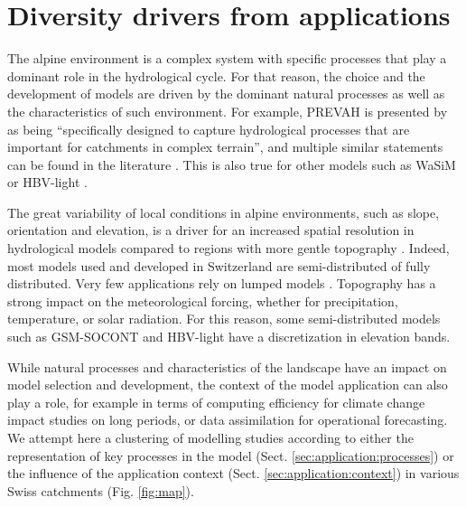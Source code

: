 \documentclass[10pt,a4paper]{article}
\begin{document}
\section{Diversity drivers from applications}
\label{sec:application}

The alpine environment is a complex system with specific processes that play a dominant role in the hydrological cycle. For that reason, the choice and the development of models are driven by the dominant natural processes as well as the characteristics of such environment. For example, PREVAH is presented by \citet{Anghileri2019} as being “specifically designed to capture hydrological processes that are important for catchments in complex terrain”, and multiple similar statements can be found in the literature \citep{Verbunt2007, Zappa2007a, Koplin2010,  Brunner2019e}. This is also true for other models such as WaSiM \citep{Jasper2002, Jasper2003, Thornton2021} or HBV-light \citep{SikorskaSenoner2020}. 

The great variability of local conditions in alpine environments, such as slope, orientation and elevation, is a driver for an increased spatial resolution in hydrological models compared to regions with more gentle topography \citep{Gurtz2003}. Indeed, most models used and developed in Switzerland are semi-distributed of fully distributed. Very few applications rely on lumped models \citep[for example,][]{Keller2019a}. Topography has a strong impact on the meteorological forcing, whether for precipitation, temperature, or solar radiation. For this reason, some semi-distributed models such as GSM-SOCONT and HBV-light have a discretization in elevation bands.

While natural processes and characteristics of the landscape have an impact on model selection and development, the context of the model application can also play a role, for example in terms of computing efficiency for climate change impact studies on long periods, or data assimilation for operational forecasting. We attempt here a clustering of modelling studies according to either the representation of key processes in the model (Sect. \ref{sec:application:processes}) or the influence of the application context (Sect. \ref{sec:application:context}) in various Swiss catchments (Fig. \ref{fig:map}).
\end{document}
